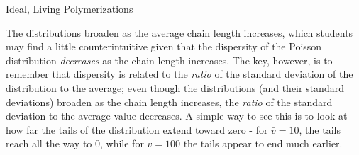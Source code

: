 \begin{activity}{Ideal, Living Polymerizations}
\begin{exercises}
\begin{solution}{}
			The distributions broaden as the average chain length increases, which students may find a little counterintuitive given that the dispersity of the Poisson distribution \emph{decreases} as the chain length increases.  The key, however, is to remember that dispersity is related to the \emph{ratio} of the standard deviation of the distribution to the average; even though the distributions (and their standard deviations) broaden as the chain length increases, the \emph{ratio} of the standard deviation to the average value decreases.  A simple way to see this is to look at how far the tails of the distribution extend toward zero - for $\bar v = 10$, the tails reach all the way to 0, while for $\bar v = 100$ the tails appear to end much earlier.
		\end{solution}
	
	
\end{exercises}




%
%	


	
\end{activity}